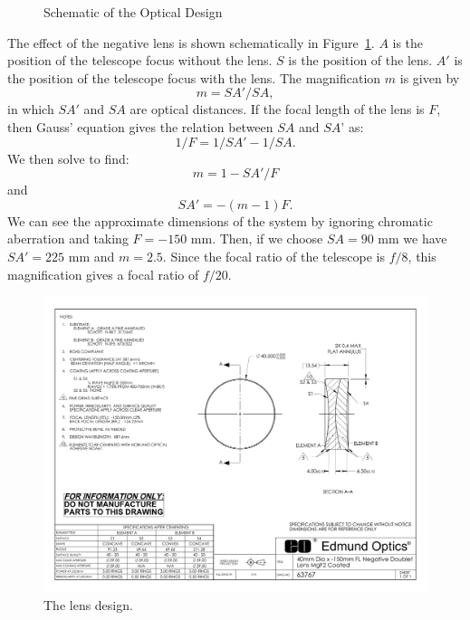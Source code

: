 \begin{figure}
\medskip
\caption{Schematic of the Optical Design}
\label{figure:optical-design}
\end{figure}

The effect of the negative lens is shown schematically in Figure~\ref{figure:optical-design}. $A$ is the position of the telescope focus without the lens. $S$ is the position of the lens. $A'$ is the position of the telescope focus with the lens. 
The magnification $m$ is given by
$$
	m = SA'/SA,
$$
in which $SA'$ and $SA$ are optical distances.
If the focal length of the lens is $F$, then Gauss’ equation gives the relation between $SA$ and $SA’$ as:
$$
	1/F = 1/SA' - 1/SA.
$$
We then solve to find:
$$
	m = 1 - SA'/F
$$
and
$$
	SA' = - (m - 1) F.
$$
We can see the approximate dimensions of the system by ignoring chromatic aberration and taking $F = -150$ mm. Then, if we choose $SA = 90$ mm we have $SA' = 225$ mm and $m = 2.5$. Since the focal ratio of the telescope is $f/8$, this magnification gives a focal ratio of $f/20$.

\begin{figure}
\begin{center}
\includegraphics[width=0.8\linewidth]{figures/huitzi-lens-design.pdf}
\medskip
\caption{The lens design.}
\label{figure:huitzi-lens-design}
\end{center}
\end{figure}


